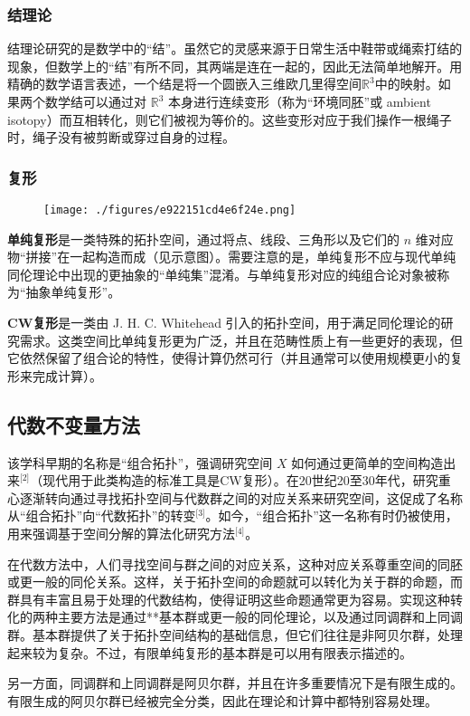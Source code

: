 \subsubsection{结理论}
结理论研究的是数学中的“结”。虽然它的灵感来源于日常生活中鞋带或绳索打结的现象，但数学上的“结”有所不同，其两端是连在一起的，因此无法简单地解开。用精确的数学语言表述，一个结是将一个圆嵌入三维欧几里得空间$\mathbb{R}^3$中的映射。如果两个数学结可以通过对 $\mathbb{R}^3$ 本身进行连续变形（称为“环境同胚”或 ambient isotopy）而互相转化，则它们被视为等价的。这些变形对应于我们操作一根绳子时，绳子没有被剪断或穿过自身的过程。
\subsubsection{复形}
\begin{figure}[ht]
\centering
\texttt{[image: ./figures/e922151cd4e6f24e.png]}
\caption{} \label{fig_DSTP_2}
\end{figure}
\textbf{单纯复形}是一类特殊的拓扑空间，通过将点、线段、三角形以及它们的 $n$ 维对应物“拼接”在一起构造而成（见示意图）。需要注意的是，单纯复形不应与现代单纯同伦理论中出现的更抽象的“单纯集”混淆。与单纯复形对应的纯组合论对象被称为“抽象单纯复形”。

\textbf{CW复形}是一类由 J. H. C. Whitehead 引入的拓扑空间，用于满足同伦理论的研究需求。这类空间比单纯复形更为广泛，并且在范畴性质上有一些更好的表现，但它依然保留了组合论的特性，使得计算仍然可行（并且通常可以使用规模更小的复形来完成计算）。
\subsection{代数不变量方法}
该学科早期的名称是“组合拓扑”，强调研究空间 $X$ 如何通过更简单的空间构造出来\(^\text{[2]}\)（现代用于此类构造的标准工具是CW复形）。在20世纪20至30年代，研究重心逐渐转向通过寻找拓扑空间与代数群之间的对应关系来研究空间，这促成了名称从“组合拓扑”向“代数拓扑”的转变\(^\text{[3]}\)。如今，“组合拓扑”这一名称有时仍被使用，用来强调基于空间分解的算法化研究方法\(^\text{[4]}\)。

在代数方法中，人们寻找空间与群之间的对应关系，这种对应关系尊重空间的同胚或更一般的同伦关系。这样，关于拓扑空间的命题就可以转化为关于群的命题，而群具有丰富且易于处理的代数结构，使得证明这些命题通常更为容易。实现这种转化的两种主要方法是通过**基本群或更一般的同伦理论，以及通过同调群和上同调群。基本群提供了关于拓扑空间结构的基础信息，但它们往往是非阿贝尔群，处理起来较为复杂。不过，有限单纯复形的基本群是可以用有限表示描述的。

另一方面，同调群和上同调群是阿贝尔群，并且在许多重要情况下是有限生成的。有限生成的阿贝尔群已经被完全分类，因此在理论和计算中都特别容易处理。
